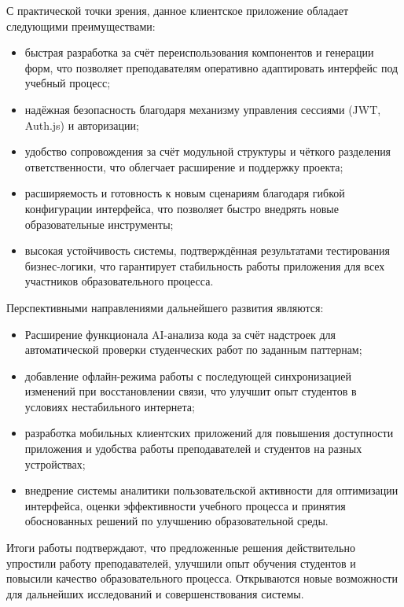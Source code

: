 С практической точки зрения, данное клиентское приложение обладает следующими преимуществами:
\begin{itemize}
  \item быстрая разработка за счёт переиспользования компонентов и генерации форм, что позволяет преподавателям оперативно адаптировать интерфейс под учебный процесс;
  \item надёжная безопасность благодаря механизму управления сессиями (JWT, Auth.js) и авторизации;
  \item удобство сопровождения за счёт модульной структуры и чёткого разделения ответственности, что облегчает расширение и поддержку проекта;
  \item расширяемость и готовность к новым сценариям благодаря гибкой конфигурации интерфейса, что позволяет быстро внедрять новые образовательные инструменты;
  \item высокая устойчивость системы, подтверждённая результатами тестирования бизнес-логики, что гарантирует стабильность работы приложения для всех участников образовательного процесса.
\end{itemize}

Перспективными направлениями дальнейшего развития являются:
\begin{itemize}
  \item Расширение функционала AI-анализа кода за счёт надстроек для автоматической проверки студенческих работ по заданным паттернам;
  \item добавление офлайн-режима работы с последующей синхронизацией изменений при восстановлении связи, что улучшит опыт студентов в условиях нестабильного интернета;
  \item разработка мобильных клиентских приложений для повышения доступности приложения и удобства работы преподавателей и студентов на разных устройствах;
  \item внедрение системы аналитики пользовательской активности для оптимизации интерфейса, оценки эффективности учебного процесса и принятия обоснованных решений по улучшению образовательной среды.
\end{itemize}

Итоги работы подтверждают, что предложенные решения действительно упростили работу преподавателей, улучшили опыт обучения студентов и повысили качество образовательного процесса. Открываются новые возможности для дальнейших исследований и совершенствования системы.
